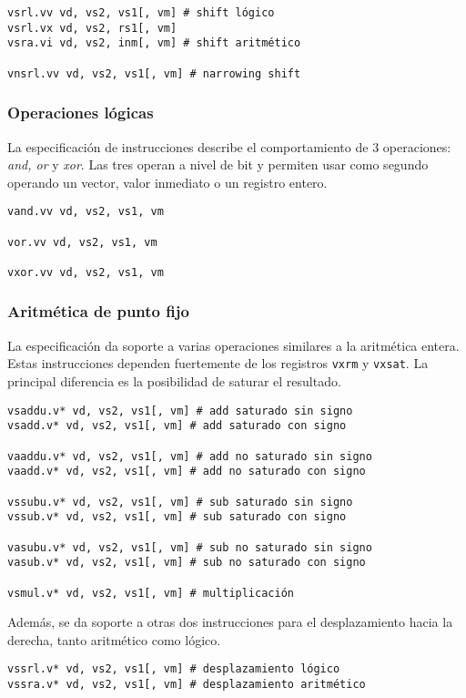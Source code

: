 \begin{lstlisting}
vsrl.vv vd, vs2, vs1[, vm] # shift lógico
vsrl.vx vd, vs2, rs1[, vm] 
vsra.vi vd, vs2, inm[, vm] # shift aritmético

vnsrl.vv vd, vs2, vs1[, vm] # narrowing shift
\end{lstlisting}


\subsubsection{Operaciones lógicas}

La especificación de instrucciones describe el comportamiento de 3 operaciones:
\textit{and, or} y \textit{xor}. Las tres operan a nivel de bit y
permiten usar como segundo operando un vector, valor inmediato o un registro
entero.

\begin{lstlisting}
vand.vv vd, vs2, vs1, vm

vor.vv vd, vs2, vs1, vm

vxor.vv vd, vs2, vs1, vm
\end{lstlisting}

\subsubsection{Aritmética de punto fijo}

La especificación da soporte a varias operaciones similares a la aritmética
entera. Estas instrucciones dependen fuertemente de los registros \texttt{vxrm}
y \texttt{vxsat}. La principal diferencia es la posibilidad de saturar el
resultado.

\begin{lstlisting}
vsaddu.v* vd, vs2, vs1[, vm] # add saturado sin signo
vsadd.v* vd, vs2, vs1[, vm] # add saturado con signo

vaaddu.v* vd, vs2, vs1[, vm] # add no saturado sin signo
vaadd.v* vd, vs2, vs1[, vm] # add no saturado con signo

vssubu.v* vd, vs2, vs1[, vm] # sub saturado sin signo
vssub.v* vd, vs2, vs1[, vm] # sub saturado con signo

vasubu.v* vd, vs2, vs1[, vm] # sub no saturado sin signo
vasub.v* vd, vs2, vs1[, vm] # sub no saturado con signo

vsmul.v* vd, vs2, vs1[, vm] # multiplicación

\end{lstlisting}

Además, se da soporte a otras dos instrucciones para el desplazamiento hacia la
derecha, tanto aritmético como lógico.
\begin{lstlisting}
vssrl.v* vd, vs2, vs1[, vm] # desplazamiento lógico
vssra.v* vd, vs2, vs1[, vm] # desplazamiento aritmético
\end{lstlisting}

